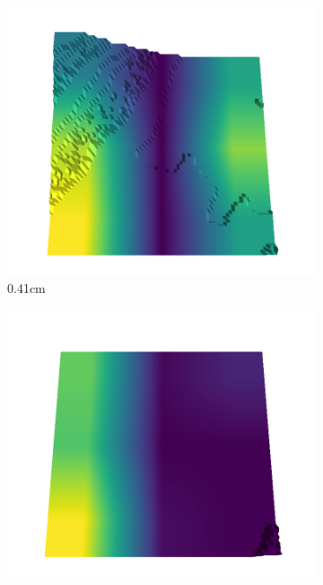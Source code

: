 \documentclass[../document.tex]{subfiles}
\begin{document}
\begin{figure}[H]
\begin{subfigure}[b]{0.192\linewidth}
    \label{fig : quarry-best-4}
    \end{subfigure}
    \begin{subfigure}[b]{0.192\linewidth}
    \includegraphics[width=\linewidth]{../img/5/quarry/best/41-patch-3d-majavi-colormap-50.png}
    \caption{0.41cm}
    \label{fig : quarry-best-5}
    \end{subfigure}
    \begin{subfigure}[b]{0.192\linewidth}
    \includegraphics[width=\linewidth]{../img/5/quarry/best/44-patch-3d-majavi-colormap-60.png}

\end{subfigure}
\end{figure}
\end{document}
